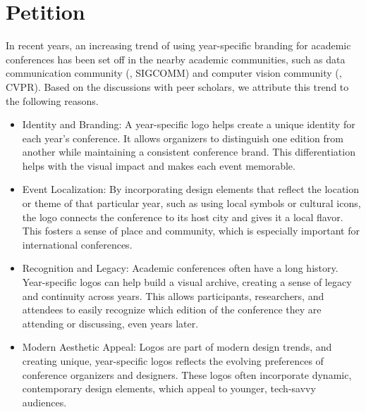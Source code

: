 \documentclass[sigconf, 10pt]{acmart}
\begin{document}
\section{Petition}
In recent years, an increasing trend of using year-specific branding for academic conferences has been set off in the nearby academic communities, such as data communication community (\eg, SIGCOMM) and computer vision community (\eg, CVPR). Based on the discussions with peer scholars, we attribute this trend to the following reasons.
\begin{itemize}[leftmargin=*]
	\item Identity and Branding: A year-specific logo helps create a unique identity for each year's conference. It allows organizers to distinguish one edition from another while maintaining a consistent conference brand. This differentiation helps with the visual impact and makes each event memorable.
	
	\item Event Localization: By incorporating design elements that reflect the location or theme of that particular year, such as using local symbols or cultural icons, the logo connects the conference to its host city and gives it a local flavor. This fosters a sense of place and community, which is especially important for international conferences.
	
	\item Recognition and Legacy: Academic conferences often have a long history. Year-specific logos can help build a visual archive, creating a sense of legacy and continuity across years. This allows participants, researchers, and attendees to easily recognize which edition of the conference they are attending or discussing, even years later.
	
	\item Modern Aesthetic Appeal: Logos are part of modern design trends, and creating unique, year-specific logos reflects the evolving preferences of conference organizers and designers. These logos often incorporate dynamic, contemporary design elements, which appeal to younger, tech-savvy audiences.
	

\end{itemize}
\end{document}
